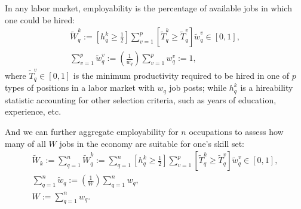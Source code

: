 \documentclass[hidelinks, nonatbib]{elsarticle}
\begin{document}
\begin{definition}[Employability]
    \label{employability}
    In any labor market, employability is the percentage of available jobs in which one could be hired:
    \begin{gather}
    \tilde{W}_{q}^{k}
    :=
    \left[
        h_{q}^{k}
        \geq
        \frac{1}{2}
    \right]
    \sum_{v=1}^{p}
    \left[
        \tilde{T}_{q}^{k}
        \geq
        \tilde{T}_{q}^{v}
    \right]
    \tilde{w}_{q}^{v}
    \in
    [0,1]
    ,
    \\
    \sum_{v=1}^{p}
    \tilde{w}_{q}^{v}
    :=
    \left(
        \frac{1}{w_q}
    \right)
    \sum_{v=1}^{p}
    w_{q}^{v}
    := 1
    ,
    \end{gather}
    where $\tilde{T}_{q}^{v} \in [0,1]$ is the minimum productivity required to be hired in one of $p$ types of positions in a labor market with $w_q$ job posts; while $h_{q}^{k}$ is a hireability statistic accounting for other selection criteria, such as years of education, experience, etc.
    
    And we can further aggregate employability for $n$ occupations to assess how many of all $W$ jobs in the economy are suitable for one's skill set:
    \begin{gather}
    \tilde{W}_{k}
    :=
    \sum_{q=1}^{n}
    \tilde{W}_{q}^{k}
    :=
    \sum_{q=1}^{n}
    \left[
        h_{q}^{k}
        \geq
        \frac{1}{2}
    \right]
    \sum_{v=1}^{p}
    \left[
        \tilde{T}_{q}^{k}
        \geq
        \tilde{T}_{q}^{v}
    \right]
    \tilde{w}_{q}^{v}
    \in
    [0,1]
    ,
    \\
    \sum_{q=1}^{n}
    \tilde{w}_{q}
    :=
    \left(
        \frac{1}{W}
    \right)
    \sum_{q=1}^{n}
    {w}_{q}
    ,
    \\
    W
    :=
    \sum_{q=1}^{n}
    {w}_{q}
    .
    \end{gather}
\end{definition} 
\end{document}
